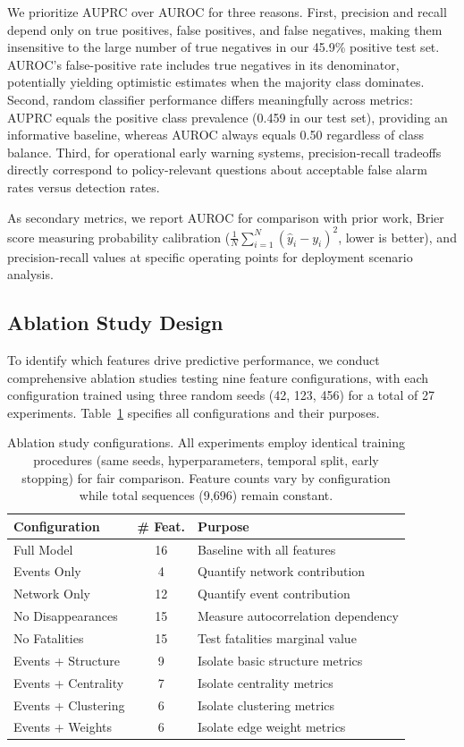 \documentclass[pdflatex,sn-mathphys-num]{sn-jnl}%
\theoremstyle{thmstyleone}%
\theoremstyle{thmstyletwo}%
\theoremstyle{thmstylethree}%
\begin{document}
We prioritize AUPRC over AUROC for three reasons. First, precision and recall depend only on true positives, false positives, and false negatives, making them insensitive to the large number of true negatives in our 45.9\% positive test set. AUROC's false-positive rate includes true negatives in its denominator, potentially yielding optimistic estimates when the majority class dominates. Second, random classifier performance differs meaningfully across metrics: AUPRC equals the positive class prevalence (0.459 in our test set), providing an informative baseline, whereas AUROC always equals 0.50 regardless of class balance. Third, for operational early warning systems, precision-recall tradeoffs directly correspond to policy-relevant questions about acceptable false alarm rates versus detection rates.

As secondary metrics, we report AUROC for comparison with prior work, Brier score measuring probability calibration ($\frac{1}{N}\sum_{i=1}^N(\hat{y}_i - y_i)^2$, lower is better), and precision-recall values at specific operating points for deployment scenario analysis.

\subsection{Ablation Study Design}

To identify which features drive predictive performance, we conduct comprehensive ablation studies testing nine feature configurations, with each configuration trained using three random seeds (42, 123, 456) for a total of 27 experiments. Table~\ref{tab:ablation_design} specifies all configurations and their purposes.

\begin{table}[h]
\centering
\caption{Ablation study configurations. All experiments employ identical training procedures (same seeds, hyperparameters, temporal split, early stopping) for fair comparison. Feature counts vary by configuration while total sequences (9,696) remain constant.}
\label{tab:ablation_design}
\begin{tabular}{lcp{5cm}}
\toprule
\textbf{Configuration} & \textbf{\# Feat.} & \textbf{Purpose} \\
\midrule
Full Model & 16 & Baseline with all features \\
Events Only & 4 & Quantify network contribution \\
Network Only & 12 & Quantify event contribution \\
No Disappearances & 15 & Measure autocorrelation dependency \\
No Fatalities & 15 & Test fatalities marginal value \\
Events + Structure & 9 & Isolate basic structure metrics \\
Events + Centrality & 7 & Isolate centrality metrics \\
Events + Clustering & 6 & Isolate clustering metrics \\
Events + Weights & 6 & Isolate edge weight metrics \\
\bottomrule
\end{tabular}
\end{table}
\end{document}
